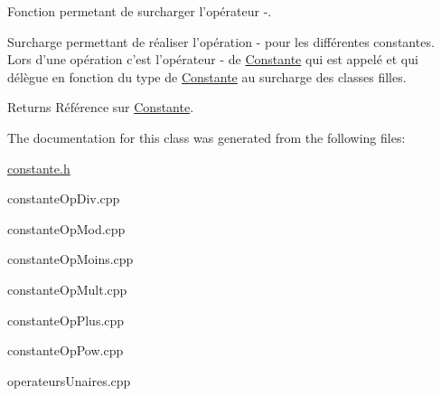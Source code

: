 Fonction permetant de surcharger l'opérateur -\/. 

Surcharge permettant de réaliser l'opération -\/ pour les différentes constantes. Lors d'une opération c'est l'opérateur -\/ de \hyperlink{class_constante}{Constante} qui est appelé et qui délègue en fonction du type de \hyperlink{class_constante}{Constante} au surcharge des classes filles. \begin{DoxyReturn}{Returns}
Référence sur \hyperlink{class_constante}{Constante}. 
\end{DoxyReturn}


The documentation for this class was generated from the following files\-:\begin{DoxyCompactItemize}
\item 
\hyperlink{constante_8h}{constante.\-h}\item 
constante\-Op\-Div.\-cpp\item 
constante\-Op\-Mod.\-cpp\item 
constante\-Op\-Moins.\-cpp\item 
constante\-Op\-Mult.\-cpp\item 
constante\-Op\-Plus.\-cpp\item 
constante\-Op\-Pow.\-cpp\item 
operateurs\-Unaires.\-cpp\end{DoxyCompactItemize}

